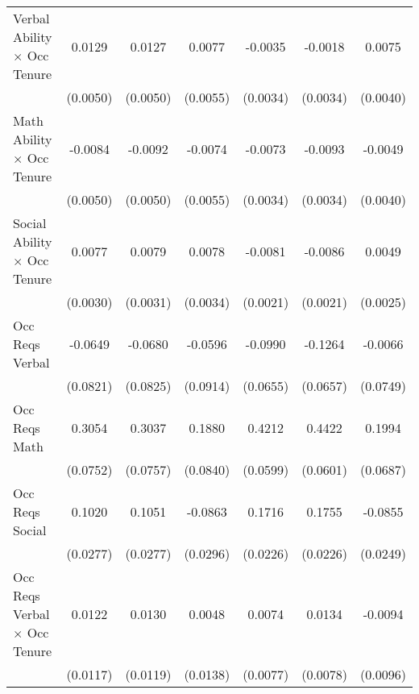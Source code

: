 {\begin{longtable}{l*{6}{c}}
Verbal Ability $\times$ Occ Tenure&      0.0129\sym{***}&      0.0127\sym{**} &      0.0077         &     -0.0035         &     -0.0018         &      0.0075\sym{*}  \\
                    &    (0.0050)         &    (0.0050)         &    (0.0055)         &    (0.0034)         &    (0.0034)         &    (0.0040)         \\
Math Ability $\times$ Occ Tenure&     -0.0084\sym{*}  &     -0.0092\sym{*}  &     -0.0074         &     -0.0073\sym{**} &     -0.0093\sym{***}&     -0.0049         \\
                    &    (0.0050)         &    (0.0050)         &    (0.0055)         &    (0.0034)         &    (0.0034)         &    (0.0040)         \\
Social Ability $\times$ Occ Tenure&      0.0077\sym{**} &      0.0079\sym{**} &      0.0078\sym{**} &     -0.0081\sym{***}&     -0.0086\sym{***}&      0.0049\sym{**} \\
                    &    (0.0030)         &    (0.0031)         &    (0.0034)         &    (0.0021)         &    (0.0021)         &    (0.0025)         \\
Occ Reqs Verbal     &     -0.0649         &     -0.0680         &     -0.0596         &     -0.0990         &     -0.1264\sym{*}  &     -0.0066         \\
                    &    (0.0821)         &    (0.0825)         &    (0.0914)         &    (0.0655)         &    (0.0657)         &    (0.0749)         \\
Occ Reqs Math       &      0.3054\sym{***}&      0.3037\sym{***}&      0.1880\sym{**} &      0.4212\sym{***}&      0.4422\sym{***}&      0.1994\sym{***}\\
                    &    (0.0752)         &    (0.0757)         &    (0.0840)         &    (0.0599)         &    (0.0601)         &    (0.0687)         \\
Occ Reqs Social     &      0.1020\sym{***}&      0.1051\sym{***}&     -0.0863\sym{***}&      0.1716\sym{***}&      0.1755\sym{***}&     -0.0855\sym{***}\\
                    &    (0.0277)         &    (0.0277)         &    (0.0296)         &    (0.0226)         &    (0.0226)         &    (0.0249)         \\
Occ Reqs Verbal $\times$ Occ Tenure&      0.0122         &      0.0130         &      0.0048         &      0.0074         &      0.0134\sym{*}  &     -0.0094         \\
                    &    (0.0117)         &    (0.0119)         &    (0.0138)         &    (0.0077)         &    (0.0078)         &    (0.0096)         \\

\end{longtable}}
